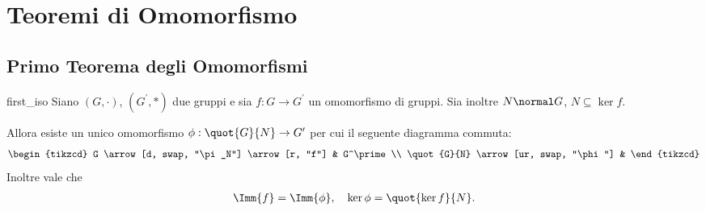 \section{Teoremi di Omomorfismo}

\subsection{Primo Teorema degli Omomorfismi}
\begin{theorem}
     {first_iso}
    Siano $(G, \cdot)$, $(G^\prime, *)$ due gruppi e sia $f : G \to G^\prime$ un omomorfismo di gruppi. Sia inoltre $N \normal G$, $N \subseteq \ker f$.

    Allora esiste un unico omomorfismo $\phi : \quot{G}{N} \to G^\prime$ per cui il seguente diagramma commuta:
    \begin{equation}
        \begin{tikzcd}
            G \arrow[d, swap, "\pi_N"] \arrow[r, "f"] & G^\prime \\
            \quot{G}{N} \arrow[ur, swap, "\phi"] &
        \end{tikzcd}
    \end{equation}
    Inoltre vale che \begin{align*}
        \Imm{f} = \Imm{\phi}, \quad \ker \phi = \quot{\ker f}{N}.
    \end{align*}
\end{theorem}
